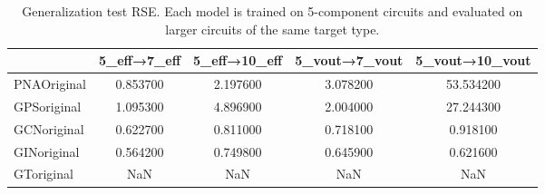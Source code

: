 \begin{table}
\caption{Generalization test RSE. Each model is trained on 5-component circuits and evaluated on larger circuits of the same target type.}
\label{tab:generalization_results}
\begin{tabular}{lcccc}
\toprule
 & 5_eff→7_eff & 5_eff→10_eff & 5_vout→7_vout & 5_vout→10_vout \\
\midrule
PNAOriginal & 0.853700 & 2.197600 & 3.078200 & 53.534200 \\
GPSoriginal & 1.095300 & 4.896900 & 2.004000 & 27.244300 \\
GCNoriginal & 0.622700 & 0.811000 & 0.718100 & 0.918100 \\
GINoriginal & 0.564200 & 0.749800 & 0.645900 & 0.621600 \\
GToriginal & NaN & NaN & NaN & NaN \\
\bottomrule
\end{tabular}
\end{table}

